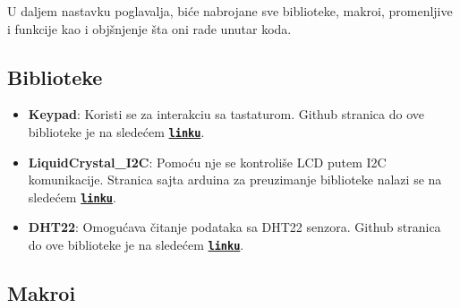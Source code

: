 \documentclass[a4paper, 12pt]{article}
\begin{document}
U daljem nastavku poglavalja, biće nabrojane sve biblioteke, makroi, promenljive i funkcije kao i objšnjenje šta oni rade unutar koda.
    
\vspace{10pt}

	\subsection{Biblioteke}
	\begin{itemize}
    		\item \textbf{Keypad}: Koristi se za interakciu sa tastaturom. Github stranica do ove biblioteke je na sledećem \textbf{\texttt{\href{https://github.com/Chris--A/Keypad.git}{linku}}}.
    		
    		\item \textbf{LiquidCrystal\_I2C}: Pomoću nje se kontroliše LCD putem I2C komunikacije. Stranica sajta arduina za preuzimanje biblioteke nalazi se na sledećem \textbf{\texttt{\href{https://downloads.arduino.cc/libraries/github.com/marcoschwartz/LiquidCrystal_I2C-1.1.2.zip}{linku}}}. 
    		
    		\item \textbf{DHT22}: Omogućava čitanje podataka sa DHT22 senzora. Github stranica do ove biblioteke je na sledećem \textbf{\texttt{\href{https://github.com/Chris--A/Keypad.git}{linku}}}.
	\end{itemize}

\newpage

	\subsection{Makroi}

\vspace{10pt}
\end{document}
